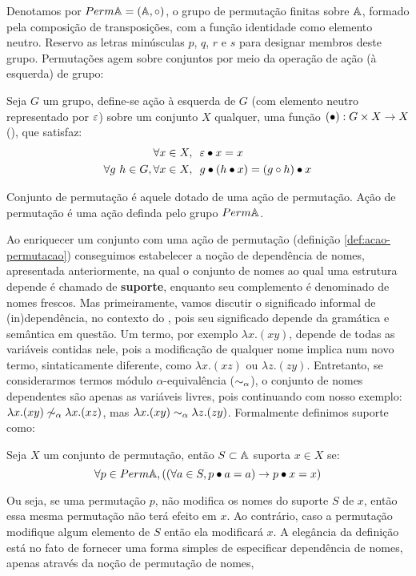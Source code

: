 Denotamos por $Perm \mathbb{A} = (\mathbb{A}, \circ)$, o grupo de permutação finitas sobre $\mathbb{A}$, formado pela composição de transposições, com a função identidade como elemento neutro. Reservo as letras minúsculas $p$, $q$, $r$ e $s$ para designar membros deste grupo. Permutações agem sobre conjuntos por meio da operação de ação (à esquerda) de grupo:
\begin{definicao}
	Seja $G$ um grupo, define-se ação à esquerda de $G$ (com elemento neutro representado por $\varepsilon$) sobre um conjunto $X$ qualquer, uma função $(\bullet) : G \times X \rightarrow X$ (), que satisfaz:
	\begin{align}
		\forall x \in X,&~~ \varepsilon \bullet x = x \label{eq:act-neutral}\\
		\forall g~h \in G, \forall x \in X,&~~ g \bullet (h \bullet x) = (g \circ h) \bullet x \label{eq:act-compat}
	\end{align}
\end{definicao}\noindent
\begin{definicao}\label{def:acao-permutacao}
	Conjunto de permutação é aquele dotado de uma ação de permutação. Ação de permutação é uma ação definda pelo grupo $Perm \mathbb{A}$.
\end{definicao}\noindent

Ao enriquecer um conjunto com uma ação de permutação (definição \ref{def:acao-permutacao}) conseguimos estabelecer a noção de dependência de nomes, apresentada anteriormente, na qual o conjunto de nomes ao qual uma estrutura depende é chamado de \textbf{suporte}, enquanto seu complemento é denominado de nomes frescos.
Mas primeiramente, vamos discutir o significado informal de (in)dependência, no contexto do \lcalc, pois seu significado depende da gramática e semântica em questão. Um termo, por exemplo $\lambda x. (xy)$, depende de todas as variáveis contidas nele, pois a modificação de qualquer nome implica num novo termo, sintaticamente diferente, como $\lambda x. (xz)$ ou $\lambda z. (zy)$. Entretanto, se considerarmos termos módulo $\alpha$-equivalência ($\sim_{\alpha}$), o conjunto de nomes dependentes são apenas as variáveis livres, pois continuando com nosso exemplo: $\lambda x. (xy) \not\sim_{\alpha} \lambda x. (xz)$, mas $\lambda x. (xy) \sim_{\alpha} \lambda z. (zy)$. Formalmente definimos suporte como:
\begin{definicao}[Suporte]
	Seja $X$ um conjunto de permutação, então $S \subset \mathbb{A}$ suporta $x \in X$ se:
	\begin{equation}\label{eq:suporte}
		\forall p \in Perm \mathbb{A}, ((\forall a \in S, p \bullet a = a) \rightarrow p \bullet x = x)
	\end{equation}
\end{definicao}\noindent
Ou seja, se uma permutação $p$, não modifica os nomes do suporte $S$ de $x$, então essa mesma permutação não terá efeito em $x$. Ao contrário, caso a permutação modifique algum elemento de $S$ então ela modificará $x$. A elegância da definição está no fato de fornecer uma forma simples de especificar dependência de nomes, apenas através da noção de permutação de nomes, 

